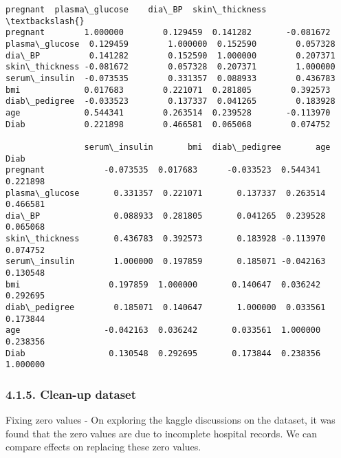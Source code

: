 \documentclass[11pt]{article}
\makeatletter
\newcommand{\boxspacing}{\kern\kvtcb@left@rule\kern\kvtcb@boxsep}
\newcommand{\prompt}[4]{
        \ttfamily\llap{{\color{#2}[#3]:\hspace{3pt}#4}}\vspace{-\baselineskip}
    }
\makeatother
\begin{document}
            \begin{tcolorbox}[breakable, size=fbox, boxrule=.5pt, pad at break*=1mm, opacityfill=0]
\prompt{Out}{outcolor}{355}{\boxspacing}
\begin{Verbatim}[commandchars=\\\{\}]
                pregnant  plasma\_glucose    dia\_BP  skin\_thickness  \textbackslash{}
pregnant        1.000000        0.129459  0.141282       -0.081672
plasma\_glucose  0.129459        1.000000  0.152590        0.057328
dia\_BP          0.141282        0.152590  1.000000        0.207371
skin\_thickness -0.081672        0.057328  0.207371        1.000000
serum\_insulin  -0.073535        0.331357  0.088933        0.436783
bmi             0.017683        0.221071  0.281805        0.392573
diab\_pedigree  -0.033523        0.137337  0.041265        0.183928
age             0.544341        0.263514  0.239528       -0.113970
Diab            0.221898        0.466581  0.065068        0.074752

                serum\_insulin       bmi  diab\_pedigree       age      Diab
pregnant            -0.073535  0.017683      -0.033523  0.544341  0.221898
plasma\_glucose       0.331357  0.221071       0.137337  0.263514  0.466581
dia\_BP               0.088933  0.281805       0.041265  0.239528  0.065068
skin\_thickness       0.436783  0.392573       0.183928 -0.113970  0.074752
serum\_insulin        1.000000  0.197859       0.185071 -0.042163  0.130548
bmi                  0.197859  1.000000       0.140647  0.036242  0.292695
diab\_pedigree        0.185071  0.140647       1.000000  0.033561  0.173844
age                 -0.042163  0.036242       0.033561  1.000000  0.238356
Diab                 0.130548  0.292695       0.173844  0.238356  1.000000
\end{Verbatim}
\end{tcolorbox}

    \hypertarget{clean-up-dataset}{%
\subsubsection{4.1.5. Clean-up dataset}\label{clean-up-dataset}}

Fixing zero values - On exploring the kaggle discussions on the dataset,
it was found that the zero values are due to incomplete hospital
records. We can compare effects on replacing these zero values.
\end{document}
